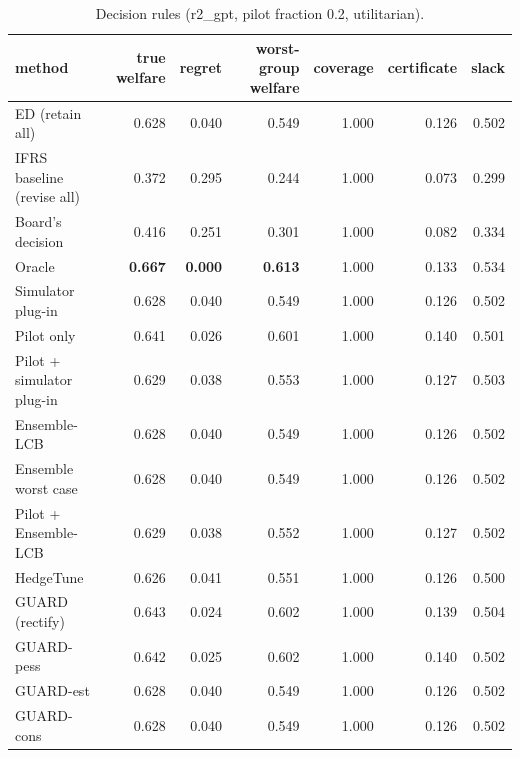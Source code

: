 \begin{table}[t]
\centering
\small
\begin{tabular}{lrrrrrr}
\toprule
method & true welfare & regret & worst-group welfare & coverage & certificate & slack \\
\midrule
ED (retain all) & 0.628 & 0.040 & 0.549 & 1.000 & 0.126 & 0.502 \\
IFRS baseline (revise all) & 0.372 & 0.295 & 0.244 & 1.000 & 0.073 & 0.299 \\
Board's decision & 0.416 & 0.251 & 0.301 & 1.000 & 0.082 & 0.334 \\
Oracle & \textbf{0.667} & \textbf{0.000} & \textbf{0.613} & 1.000 & 0.133 & 0.534 \\
Simulator plug-in & 0.628 & 0.040 & 0.549 & 1.000 & 0.126 & 0.502 \\
Pilot only & 0.641 & 0.026 & 0.601 & 1.000 & 0.140 & 0.501 \\
Pilot + simulator plug-in & 0.629 & 0.038 & 0.553 & 1.000 & 0.127 & 0.503 \\
Ensemble-LCB & 0.628 & 0.040 & 0.549 & 1.000 & 0.126 & 0.502 \\
Ensemble worst case & 0.628 & 0.040 & 0.549 & 1.000 & 0.126 & 0.502 \\
Pilot + Ensemble-LCB & 0.629 & 0.038 & 0.552 & 1.000 & 0.127 & 0.502 \\
HedgeTune & 0.626 & 0.041 & 0.551 & 1.000 & 0.126 & 0.500 \\
GUARD (rectify) & 0.643 & 0.024 & 0.602 & 1.000 & 0.139 & 0.504 \\
GUARD-pess & 0.642 & 0.025 & 0.602 & 1.000 & 0.140 & 0.502 \\
GUARD-est & 0.628 & 0.040 & 0.549 & 1.000 & 0.126 & 0.502 \\
GUARD-cons & 0.628 & 0.040 & 0.549 & 1.000 & 0.126 & 0.502 \\
\bottomrule
\end{tabular}
\caption{Decision rules (r2\_gpt, pilot fraction 0.2, utilitarian).}
\label{tab:methods-utilitarian}
\end{table}
